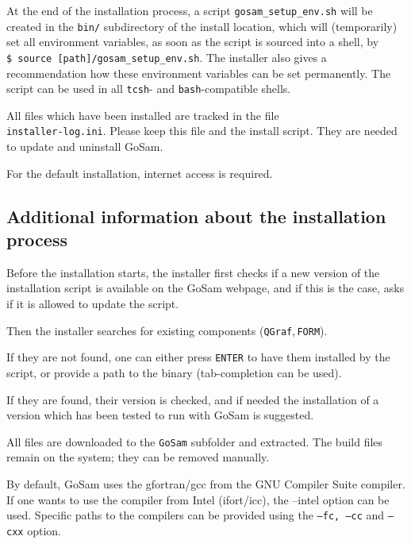 \documentclass[11pt,a4paper]{refrep}
\newcommand{\gosam}{{\sc GoSam}\xspace}
\newcommand{\qgraf}{{\tt QGraf}\xspace}
\begin{document}
At the end of the installation process, 
a script {\tt gosam\_setup\_env.sh} will be created in the
{\tt bin/} subdirectory of the install location, 
which will (temporarily) set all environment
variables, as soon as the script is sourced into a shell,  
by \\
{\tt \$ source [path]/gosam\_setup\_env.sh}.
The installer also gives  a recommendation how
these environment variables can be set permanently.
The script can be used in all {\tt tcsh}- and {\tt bash}-compatible shells.

All  files which have been installed are tracked in the file \\
{\tt installer-log.ini}.
Please keep this file and the install script. They are needed to update and
uninstall \gosam. 

For the default installation, internet access is required.

\subsection{Additional information about the installation process}

Before the installation starts, the installer first checks if a new version of
the installation script is available on the \gosam webpage,  
and if this is the case, asks if it is allowed to update the script.

Then the installer searches for existing components (\qgraf,\,{\tt FORM}).

If they are not found, one can either 
press {\tt ENTER} to have them installed by the script, or provide a path to
the binary (tab-completion can be used).

If they are found, their version is checked, 
and if needed the installation
of a version which has been tested to run with \gosam is suggested.

All files are downloaded to the {\tt GoSam} subfolder and extracted.
The build files remain on the system; they can be removed manually.


By default, \gosam uses the gfortran/gcc from the GNU Compiler Suite compiler.
If one wants to use the compiler from Intel (ifort/icc), the --intel option can be used.
Specific paths to the compilers can be provided using the {\tt --fc, --cc} and 
{\tt --cxx} option.
\end{document}
